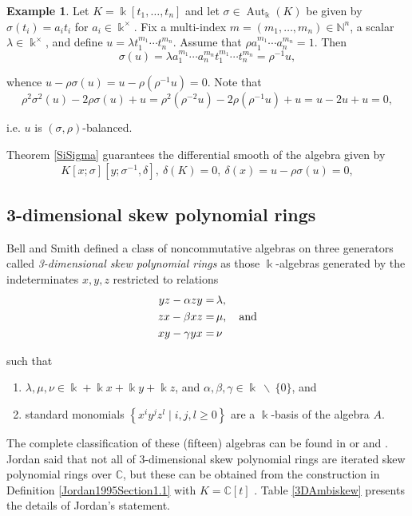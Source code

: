 \documentclass{amsart}
\theoremstyle{definition}
\newtheorem{example}[theorem]{Example}
\theoremstyle{remark}
\numberwithin{equation}{section}
\begin{document}
\begin{example}\label{Exot}
Let $K=\Bbbk[t_1,\ldots,t_n]$ and let $\sigma\in \operatorname{Aut}_{\Bbbk}(K)$ be given by $\sigma(t_i) = a_i t_i$ for $a_i\in \Bbbk^\times$. Fix a multi-index $m=(m_1,\ldots,m_n)\in \mathbb{N}^n$, a scalar $\lambda\in \Bbbk^\times$, and define $u=\lambda t_1^{m_1}\cdots t_n^{m_n}$. 
Assume that $\rho a_1^{m_1}\cdots a_n^{m_n}=1$. Then
\[
\sigma(u)=\lambda a_1^{m_1}\cdots a_n^{m_n} t_1^{m_1}\cdots t_n^{m_n} =\rho^{-1}u,
\]

whence $u-\rho\sigma(u)=u-\rho(\rho^{-1}u)=0$. Note that 
\[
\rho^2\sigma^2(u)-2\rho\sigma(u)+u=\rho^2(\rho^{-2}u)-2\rho(\rho^{-1}u)+u= u-2u+u=0,
\]

i.e. $u$ is $(\sigma,\rho)$-balanced.

Theorem \ref{SiSigma} guarantees the differential smooth of the algebra given by 
\[
K[x;\sigma][y;\sigma^{-1},\delta], \ \delta(K)=0,\ \delta(x)=u-\rho\sigma(u)=0,
\]
\end{example}

\subsection{3-dimensional skew polynomial rings}

Bell and Smith \cite{BellSmith1990} defined a class of noncommutative algebras on three generators called {\em 3-dimensional skew polynomial rings} as those $\Bbbk$-algebras generated by the indeterminates $x, y, z$ restricted to relations 
\begin{align*}
yz - \alpha zy = &\, \lambda, \\
zx - \beta xz = &\, \mu, \quad {\rm and} \\
xy - \gamma yx = &\, \nu
\end{align*}

such that
\begin{enumerate}
\item [\rm (i)] $\lambda, \mu, \nu\in \Bbbk+\Bbbk x+\Bbbk y+\Bbbk z$, and $\alpha, \beta, \gamma \in \Bbbk\ \backslash\ \{0\}$, and

\item [\rm (ii)] standard monomials $\left\{x^iy^jz^l\mid i,j,l\ge 0\right\}$ are a $\Bbbk$-basis of the algebra $A$.
\end{enumerate}

The complete classification of these (fifteen) algebras can be found in \cite[Definition C4.3 and Theorem C.4.3.1]{Rosenberg1995} or \cite{ReyesSuarez20173D} and \cite[Proposition 2.8 and Remark 2.9]{RubianoReyes20263D}. Jordan said that not all of 3-dimensional skew polynomial rings are iterated skew polynomial rings over $\mathbb{C}$, but these can be obtained from the construction in Definition \ref{Jordan1995Section1.1} with $K = \mathbb{C}[t]$ \cite[Section 1.5]{Jordan1995}. Table \ref{3DAmbiskew} presents the details of Jordan's statement.
\end{document}
